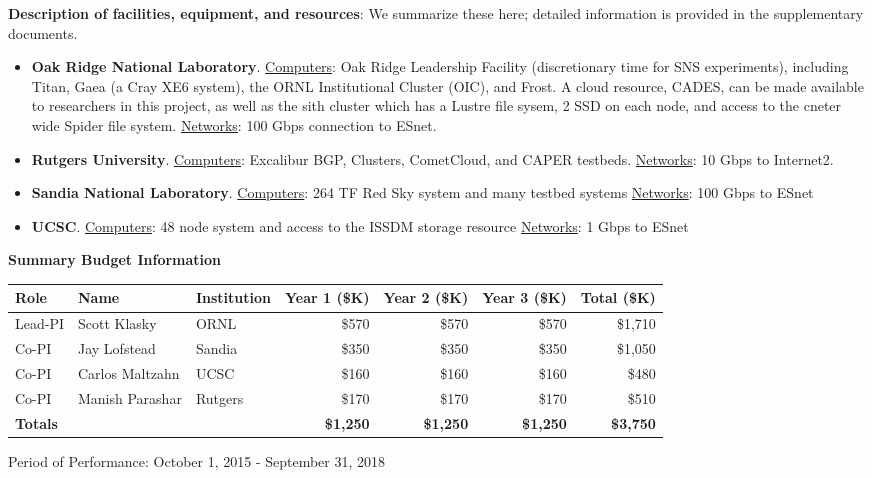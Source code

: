 \vspace{2ex}

\noindent
{\bf Description of facilities, equipment, and resources}: We summarize these here; detailed information is provided in the supplementary documents.
\begin{itemize}
\item
{\bf Oak Ridge National Laboratory}. \underline{Computers}:
Oak Ridge Leadership Facility (discretionary time for SNS experiments), including
Titan, Gaea (a Cray XE6 system), the ORNL Institutional Cluster (OIC),
and Frost. A cloud resource, CADES, can be made available to
researchers in this project, as well as the sith cluster which has a Lustre file
sysem, 2 SSD on each node, and access to the cneter wide Spider file system.
 \underline{Networks}: 100 Gbps connection to ESnet.
\vspace{-1ex}
\item
{\bf Rutgers University}. \underline{Computers}: Excalibur BGP, Clusters, CometCloud, and CAPER testbeds. \underline{Networks}: 10 Gbps to Internet2.
\vspace{-1ex}
\item
{\bf Sandia National Laboratory}.
\underline{Computers}: 264 TF Red Sky system and many testbed systems
\underline{Networks}: 100 Gbps to ESnet
\item
{\bf UCSC}.
\underline{Computers}:  48 node system and access to the ISSDM storage resource
\underline{Networks}: 1 Gbps to ESnet



\end{itemize}

\begin{center}
\textbf{\large Summary Budget Information}
\medskip
\begin{tabular}{| l | l | l | r | r | r | r |} \hline
Role & Name & Institution & Year 1 (\$K) & Year 2 (\$K) &   Year 3 (\$K) & Total (\$K) \\
\hline
Lead-PI & Scott Klasky & ORNL & {\$}570 &  {\$}570 &  {\$}570 &   {\$}1,710\\
Co-PI & Jay Lofstead & Sandia  &  {\$}350 &  {\$}350 &  {\$}350 &  {\$}1,050 \\
Co-PI & Carlos  Maltzahn & UCSC  &  {\$}160 &  {\$}160 &  {\$}160 &  {\$}480 \\
Co-PI & Manish Parashar & Rutgers &  {\$}170 &  {\$}170 &  {\$}170 &  {\$}510  \\
\hline
{\bf Totals}  & & & {\bf  {\$}1,250} & {\bf  {\$}1,250} & {\bf  {\$}1,250} & {\bf  {\$}3,750}\\
\hline
\end{tabular}
\end{center}

\noindent
{Period of Performance: October 1, 2015 - September 31, 2018}\\
\noindent
\vfill
